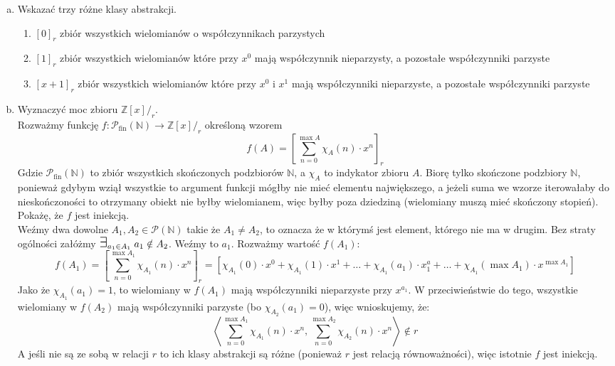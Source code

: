\documentclass[10pt]{article}
\newcommand{\N}{\mathbb{N}}
\newcommand{\Z}{\mathbb{Z}}
\newcommand{\Pows}{\mathcal{P}}
\newcommand{\Exists}{{\Large\mbox{$\exists$}}}
\begin{document}
\begin{enumerate}[a)]
    \item Wskazać trzy różne klasy abstrakcji.
    \begin{enumerate} [1)]
        \item $[0]_r$ zbiór wszystkich wielomianów o współczynnikach parzystych

        \item $[1]_r$ zbiór wszystkich wielomianów które przy $x^0$ mają współczynnik nieparzysty, a pozostałe współczynniki parzyste

        \item $[x + 1]_r$ zbiór wszystkich wielomianów które przy $x^0$ i $x^1$ mają współczynniki nieparzyste, a pozostałe współczynniki parzyste
    \end{enumerate}

    \item Wyznaczyć moc zbioru $\Z [x]/_r$. \\[10pt]
    Rozważmy funkcję $f \colon \Pows_{\text{fin}} (\N) \to \Z[x]/_r$ określoną wzorem 
    $$f(A) = \left[\sum_{n=0}^{\max A} \chi_A (n) \cdot x^n\right]_r$$ 
    Gdzie $\Pows_{\text{fin}}(\N)$ to zbiór wszystkich skończonych podzbiorów $\N$, a $\chi_A$ to indykator zbioru $A$. Biorę tylko skończone podzbiory $\N$, ponieważ gdybym wziął wszystkie to argument funkcji mógłby nie mieć elementu największego, a jeżeli suma we wzorze iterowałaby do nieskończoności to otrzymany obiekt nie byłby wielomianem, więc byłby poza dziedziną (wielomiany muszą mieć skończony stopień). \newpage
    Pokażę, że $f$ jest iniekcją. \\[5pt]
    Weźmy dwa dowolne $A_1, A_2 \in \Pows(\N)$ takie że $A_1 \neq A_2$, to oznacza że w którymś jest element, którego nie ma w drugim. Bez straty ogólności załóżmy $\Exists_{a_1 \in A_1} \; a_1 \notin A_2$. Weźmy to $a_1$. Rozważmy wartość $f(A_1)$:
    $$f(A_1) = \left[\sum_{n=0}^{\max A_1} \chi_{A_1} (n) \cdot x^n\right]_r = \left[ \chi_{A_1}(0) \cdot x^0 + \chi_{A_1}(1) \cdot x^1 + \ldots + \chi_{A_1}(a_1) \cdot x^a_1 + \ldots + \chi_{A_1}(\max A_1) \cdot x^{\max A_1}\right]$$
    Jako że $\chi_{A_1}(a_1) = 1$, to wielomiany w $f(A_1)$ mają współczynniki nieparzyste przy $x^{a_1}$. W przeciwieństwie do tego, wszystkie wielomiany w $f(A_2)$ mają współczynniki parzyste (bo $\chi_{A_2}(a_1) = 0$), więc wnioskujemy, że:
    $$\left\langle \sum_{n=0}^{\max A_1} \chi_{A_1} (n) \cdot x^n, \sum_{n=0}^{\max A_2} \chi_{A_2} (n) \cdot x^n \right\rangle \notin r$$
    A jeśli nie są ze sobą w relacji $r$ to ich klasy abstrakcji są różne (ponieważ $r$ jest relacją równoważności), więc istotnie $f$ jest iniekcją. \\[10pt]

\end{enumerate}
\end{document}
